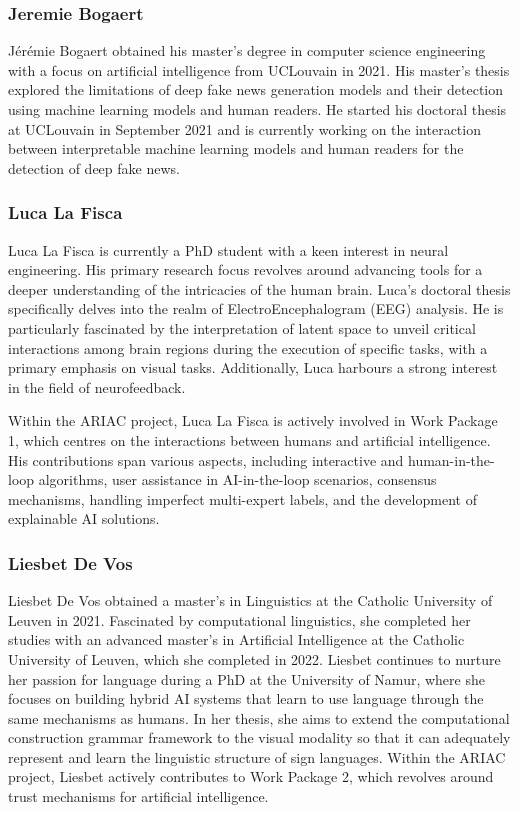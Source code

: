 \subsubsection{Jeremie Bogaert}

Jérémie Bogaert obtained his master's degree in computer science engineering with a focus on artificial intelligence from UCLouvain in 2021. His master's thesis explored the limitations of deep fake news generation models and their detection using machine learning models and human readers. He started his doctoral thesis at UCLouvain in September 2021 and is currently working on the interaction between interpretable machine learning models and human readers for the detection of deep fake news.

\subsubsection{Luca La Fisca}

Luca La Fisca is currently a PhD student with a keen interest in neural engineering. His primary research focus revolves around advancing tools for a deeper understanding of the intricacies of the human brain. Luca's doctoral thesis specifically delves into the realm of ElectroEncephalogram (EEG) analysis. He is particularly fascinated by the interpretation of latent space to unveil critical interactions among brain regions during the execution of specific tasks, with a primary emphasis on visual tasks. Additionally, Luca harbours a strong interest in the field of neurofeedback.

Within the ARIAC project, Luca La Fisca is actively involved in Work Package 1, which centres on the interactions between humans and artificial intelligence. His contributions span various aspects, including interactive and human-in-the-loop algorithms, user assistance in AI-in-the-loop scenarios, consensus mechanisms, handling imperfect multi-expert labels, and the development of explainable AI solutions.

\subsubsection{Liesbet De Vos}

Liesbet De Vos obtained a master's in Linguistics at the Catholic University of Leuven in 2021. Fascinated by computational linguistics, she completed her studies with an advanced master's in Artificial Intelligence at the Catholic University of Leuven, which she completed in 2022. Liesbet continues to nurture her passion for language during a PhD at the University of Namur, where she focuses on building hybrid AI systems that learn to use language through the same mechanisms as humans. In her thesis, she aims to extend the computational construction grammar framework to the visual modality so that it can adequately represent and learn the linguistic structure of sign languages. Within the ARIAC project, Liesbet actively contributes to Work Package 2, which revolves around trust mechanisms for artificial intelligence. 

